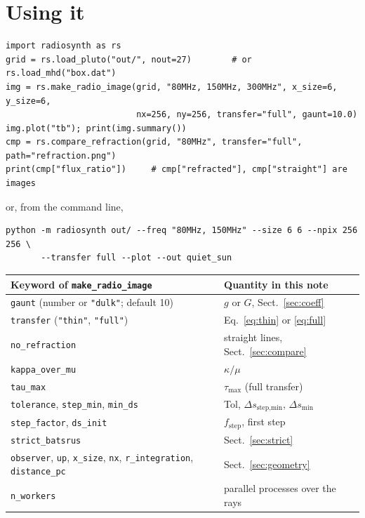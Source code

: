 \documentclass[11pt,a4paper]{article}
\newcommand{\code}[1]{\texttt{#1}}
\begin{document}
\section{Using it}\label{sec:use}

\begin{small}
\begin{verbatim}
import radiosynth as rs
grid = rs.load_pluto("out/", nout=27)        # or rs.load_mhd("box.dat")
img = rs.make_radio_image(grid, "80MHz, 150MHz, 300MHz", x_size=6, y_size=6,
                          nx=256, ny=256, transfer="full", gaunt=10.0)
img.plot("tb"); print(img.summary())
cmp = rs.compare_refraction(grid, "80MHz", transfer="full", path="refraction.png")
print(cmp["flux_ratio"])     # cmp["refracted"], cmp["straight"] are images
\end{verbatim}
\end{small}
or, from the command line,
\begin{small}
\begin{verbatim}
python -m radiosynth out/ --freq "80MHz, 150MHz" --size 6 6 --npix 256 256 \
       --transfer full --plot --out quiet_sun
\end{verbatim}
\end{small}

\begin{center}
\small
\begin{tabular}{@{}l l@{}}
\toprule
Keyword of \code{make\_radio\_image} & Quantity in this note \\
\midrule
\code{gaunt} (number or \code{"dulk"}; default 10) & $g$ or $G$, Sect.~\ref{sec:coeff} \\
\code{transfer} (\code{"thin"}, \code{"full"}) & Eq.~\eqref{eq:thin} or \eqref{eq:full} \\
\code{no\_refraction} & straight lines, Sect.~\ref{sec:compare} \\
\code{kappa\_over\_mu} & $\kappa/\mu$ \\
\code{tau\_max} & $\tau_\text{max}$ (full transfer) \\
\code{tolerance}, \code{step\_min}, \code{min\_ds} & Tol, $\Delta s_\text{step,min}$, $\Delta s_\text{min}$ \\
\code{step\_factor}, \code{ds\_init} & $f_\text{step}$, first step \\
\code{strict\_batsrus} & Sect.~\ref{sec:strict} \\
\code{observer}, \code{up}, \code{x\_size}, \code{nx}, \code{r\_integration}, \code{distance\_pc} & Sect.~\ref{sec:geometry} \\
\code{n\_workers} & parallel processes over the rays \\
\bottomrule
\end{tabular}
\end{center}
\end{document}
